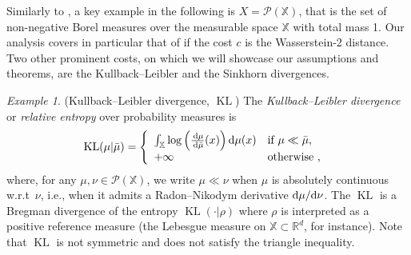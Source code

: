 \documentclass[reqno]{amsart}
\newcounter{results}[section]
\theoremstyle{plain}
\theoremstyle{remark}
\newtheorem{example}[results]{Example}
\theoremstyle{plain}
\numberwithin{equation}{section}
\theoremstyle{remark}
\newcommand{\R}{\mathbb{R}}
\newcommand{\X}{\mathbb{X}}
\newcommand{\calP}{\mathcal{P}}
\newcommand{\de}{{\,\rm d}}
\DeclareMathOperator{\KL}{KL}
\begin{document}
 Similarly to \cite{ags08},  a key example in the following is  
 $X=\calP(\X)$,  that is  the  set  of  non-negative Borel measures over the measurable space  $\X$ with total mass 1.  Our analysis  covers  in particular that of \cite{ags08} if the cost $c$ is the Wasserstein-2 distance. Two other prominent costs, on which we will showcase our assumptions and theorems,  are  the Kullback--Leibler and  the  Sinkhorn divergences.
\begin{example}(Kullback--Leibler divergence, $\KL$)
	\label{ex:KL} The {\it Kullback--Leibler divergence} or {\it relative entropy} over probability measures is
	\begin{equation*}
		\KL(\mu|\bar \mu) = \left\{
		\begin{array}{ll}
			\int_{\X}\log \left(\frac{\de \mu}{\de \bar \mu}(x)\right) {\rm d}  \mu(x)& \mbox{if } \mu \ll \bar \mu ,  \\
			+\infty & \mbox{otherwise ,  }
		\end{array}\right.
	\end{equation*}	
	where, for any $\mu,\nu\in \calP(\X)$, we write $\mu \ll \nu$ when $\mu$ is absolutely continuous w.r.t\ $\nu$, i.e., when it  admits  a Radon--Nikodym derivative $ {\rm d}  \mu/ {\rm d}  \nu$. The $\KL$ is a Bregman divergence of the entropy $\KL(\cdot| \rho)$ where $ \rho $ is  interpreted as  a positive reference  measure (the Lebesgue measure  on  $\X\subset \R^d$,  for instance). Note that  $\KL$ is not symmetric and does not satisfy the  triangle  inequality. 
\end{example}
\end{document}
